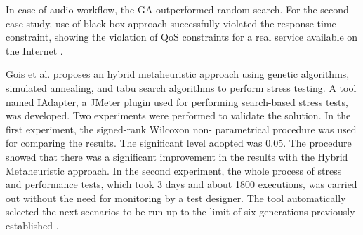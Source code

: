 In case of audio workflow, the GA outperformed random search. For the second case study, use of black-box approach successfully violated the response time constraint, showing the violation of QoS constraints for a real service available on the Internet \cite{Penta2007}.


Gois et al. proposes an hybrid metaheuristic approach using genetic algorithms, simulated annealing, and tabu search algorithms to perform stress testing. A tool named IAdapter, a JMeter plugin used for performing search-based stress tests, was developed. Two experiments were performed to validate the solution. In the first experiment, the signed-rank Wilcoxon non- parametrical procedure was used for comparing the results. The significant level adopted was 0.05. The procedure showed that there was a significant improvement in the results with the Hybrid Metaheuristic approach.
In the second experiment, the whole process of stress and performance tests, which took 3 days and about 1800 executions, was carried out without the need for monitoring by a test designer. The tool automatically selected the next scenarios to be run up to the limit of six generations previously established \cite{Gois2016}. 

